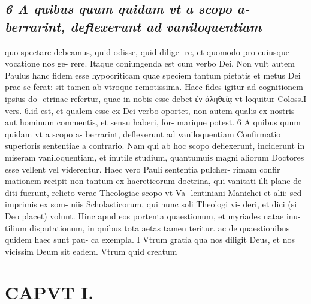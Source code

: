 \documentclass{article}
\begin{document}
\begin{pages}
\subsection*{\textit{6 A quibus quum quidam vt a scopo a- berrarint, deflexerunt ad vaniloquentiam}}quo spectare debeamus, quid odisse, quid dilige- re, et quomodo pro cuiusque vocatione nos ge- rere. Itaque coniungenda est cum verbo Dei. Non vult autem Paulus hanc fidem esse hypocriticam quae speciem tantum pietatis et metus Dei prae se ferat: sit tamen ab vtroque remotissima. Haec fides igitur ad cognitionem ipsius do- ctrinae refertur, quae in nobis esse debet ἐν ἀληθείᾳ vt loquitur Coloss.I vers. 6.id est, et qualem esse ex Dei verbo oportet, non autem qualis ex nostris aut hominum commentis, et sensu haberi, for- marique potest. 6 A quibus quum quidam vt a scopo a- berrarint, deflexerunt ad vaniloquentiam Confirmatio superioris sententiae a contrario. Nam qui ab hoc scopo deflexerunt, inciderunt in miseram vaniloquentiam, et inutile studium, quantumuis magni aliorum Doctores esse vellent vel viderentur. Haec vero Pauli sententia pulcher- rimam confir mationem recipit non tantum ex haereticorum doctrina, qui vanitati illi plane de- diti fuerunt, relicto verae Theologiae scopo vt Va- lentiniani Manichei et alii: sed imprimis ex som- niis Scholasticorum, qui nunc soli Theologi vi- deri, et dici (si Deo placet) volunt. Hinc apud eos portenta quaestionum, et myriades natae inu- tilium disputationum, in quibus tota aetas tamen teritur. ac de quaestionibus quidem haec sunt pau- ca exempla. I Vtrum gratia qua nos diligit Deus, et nos vicissim Deum sit eadem. Vtrum quid creatum  \pend
\section*{CAPVT  I. }
\marginpar{[ p.17 ]}\pstart {}
{}

\end{pages}
\end{document}
